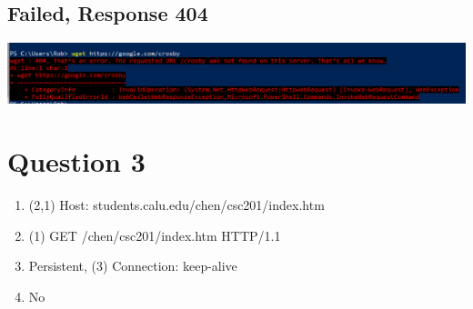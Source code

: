 \documentclass{article}
\begin{document}
\subsection*{Failed, Response 404}
\includegraphics{q2bad.png}


\section*{Question 3}

\begin{enumerate}[label=\Alph*.]
    \item (2,1) Host: students.calu.edu/chen/csc201/index.htm
    \item (1) GET /chen/csc201/index.htm HTTP/1.1
    \item Persistent, (3) Connection: keep-alive
    \item No
\end{enumerate}
\end{document}
